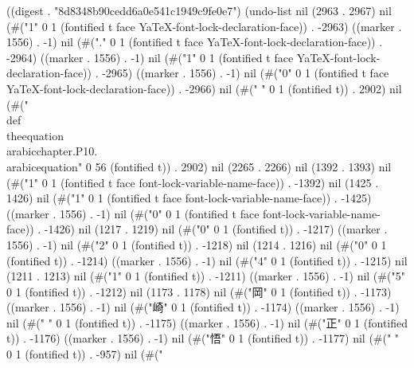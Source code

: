 
((digest . "8d8348b90cedd6a0e541c1949c9fe0e7") (undo-list nil (2963 . 2967) nil (#("1" 0 1 (fontified t face YaTeX-font-lock-declaration-face)) . -2963) ((marker . 1556) . -1) nil (#("." 0 1 (fontified t face YaTeX-font-lock-declaration-face)) . -2964) ((marker . 1556) . -1) nil (#("1" 0 1 (fontified t face YaTeX-font-lock-declaration-face)) . -2965) ((marker . 1556) . -1) nil (#("0" 0 1 (fontified t face YaTeX-font-lock-declaration-face)) . -2966) nil (#("
" 0 1 (fontified t)) . 2902) nil (#("\\def\\theequation{\\arabic{chapter}.P10.\\arabic{equation}}" 0 56 (fontified t)) . 2902) nil (2265 . 2266) nil (1392 . 1393) nil (#("1" 0 1 (fontified t face font-lock-variable-name-face)) . -1392) nil (1425 . 1426) nil (#("1" 0 1 (fontified t face font-lock-variable-name-face)) . -1425) ((marker . 1556) . -1) nil (#("0" 0 1 (fontified t face font-lock-variable-name-face)) . -1426) nil (1217 . 1219) nil (#("0" 0 1 (fontified t)) . -1217) ((marker . 1556) . -1) nil (#("2" 0 1 (fontified t)) . -1218) nil (1214 . 1216) nil (#("0" 0 1 (fontified t)) . -1214) ((marker . 1556) . -1) nil (#("4" 0 1 (fontified t)) . -1215) nil (1211 . 1213) nil (#("1" 0 1 (fontified t)) . -1211) ((marker . 1556) . -1) nil (#("5" 0 1 (fontified t)) . -1212) nil (1173 . 1178) nil (#("岡" 0 1 (fontified t)) . -1173) ((marker . 1556) . -1) nil (#("崎" 0 1 (fontified t)) . -1174) ((marker . 1556) . -1) nil (#(" " 0 1 (fontified t)) . -1175) ((marker . 1556) . -1) nil (#("正" 0 1 (fontified t)) . -1176) ((marker . 1556) . -1) nil (#("悟" 0 1 (fontified t)) . -1177) nil (#("
" 0 1 (fontified t)) . -957) nil (#("
